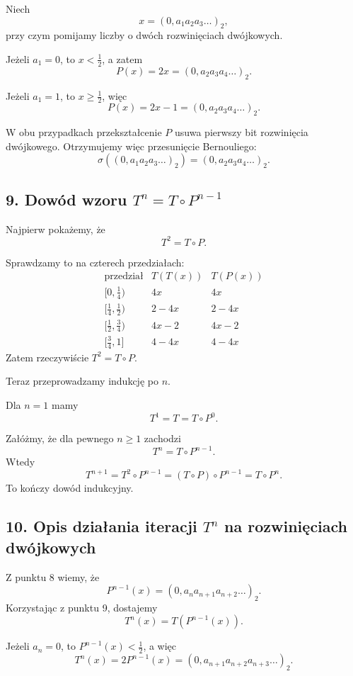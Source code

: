 \documentclass[11pt,a4paper]{article}
\theoremstyle{plain}
\theoremstyle{definition}
\begin{document}
\begin{rozwiazaniebox}
Niech
\[
    x=(0,a_1a_2a_3\ldots)_2,
\]
przy czym pomijamy liczby o dw\'och rozwini\k{e}ciach dw\'ojkowych.

Je\.zeli \(a_1=0\), to \(x<\tfrac{1}{2}\), a zatem
\[
    P(x)=2x=(0,a_2a_3a_4\ldots)_2.
\]

Je\.zeli \(a_1=1\), to \(x\ge \tfrac{1}{2}\), wi\k{e}c
\[
    P(x)=2x-1=(0,a_2a_3a_4\ldots)_2.
\]

W obu przypadkach przekszta\l cenie \(P\) usuwa pierwszy bit rozwini\k{e}cia dw\'ojkowego. Otrzymujemy
wi\k{e}c przesuni\k{e}cie Bernouliego:
\[
    \sigma((0,a_1a_2a_3\ldots)_2)=(0,a_2a_3a_4\ldots)_2.
\]

\subsection*{9. Dow\'od wzoru \(T^n = T \circ P^{n-1}\)}

Najpierw poka\.zemy, \.ze
\[
    T^2=T\circ P.
\]

Sprawdzamy to na czterech przedzia\l ach:
\[
\begin{array}{c|c|c}
\text{przedzia\l} & T(T(x)) & T(P(x)) \\ \hline
\bigl[0,\tfrac{1}{4}\bigr) & 4x & 4x \\
\bigl[\tfrac{1}{4},\tfrac{1}{2}\bigr) & 2-4x & 2-4x \\
\bigl[\tfrac{1}{2},\tfrac{3}{4}\bigr) & 4x-2 & 4x-2 \\
\bigl[\tfrac{3}{4},1\bigr] & 4-4x & 4-4x
\end{array}
\]
Zatem rzeczywi\'scie \(T^2=T\circ P\).

Teraz przeprowadzamy indukcj\k{e} po \(n\).

Dla \(n=1\) mamy
\[
    T^1=T=T\circ P^0.
\]

Za\l \'o\.zmy, \.ze dla pewnego \(n\ge 1\) zachodzi
\[
    T^n=T\circ P^{n-1}.
\]
Wtedy
\[
    T^{n+1}
    = T^2 \circ P^{n-1}
    = (T\circ P)\circ P^{n-1}
    = T\circ P^n.
\]
To ko\'nczy dow\'od indukcyjny.

\subsection*{10. Opis dzia\l ania iteracji \(T^n\) na rozwini\k{e}ciach dw\'ojkowych}

Z punktu 8 wiemy, \.ze
\[
    P^{n-1}(x)=(0,a_na_{n+1}a_{n+2}\ldots)_2.
\]
Korzystaj\k{a}c z punktu 9, dostajemy
\[
    T^n(x)=T(P^{n-1}(x)).
\]

Je\.zeli \(a_n=0\), to \(P^{n-1}(x)<\tfrac{1}{2}\), a wi\k{e}c
\[
    T^n(x)=2P^{n-1}(x)=(0,a_{n+1}a_{n+2}a_{n+3}\ldots)_2.
\]


\end{rozwiazaniebox}
\end{document}
